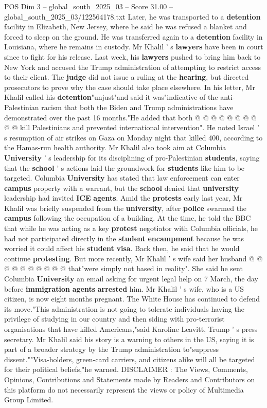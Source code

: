 \begin{textsample}{POS Dim 3 – global\_south\_2025\_03 – Score 31.00 – global\_south\_2025\_03/122564178.txt}
Later, he was transported to a \textbf{detention} facility in Elizabeth, New Jersey, where he said he was refused a blanket and forced to sleep on the ground.
He was transferred again to a \textbf{detention} facility in Louisiana, where he remains in custody.
Mr Khalil ' s \textbf{lawyers} have been in court since to fight for his release.
Last week, his \textbf{lawyers} pushed to bring him back to New York and accused the Trump administration of attempting to restrict access to their client.
The \textbf{judge} did not issue a ruling at the \textbf{hearing}, but directed prosecutors to prove why the case should take place elsewhere.
In his letter, Mr Khalil called his \textbf{detention}"unjust"and said it was"indicative of the anti-Palestinian racism that both the Biden and Trump administrations have demonstrated over the past 16 months."He added that both @ @ @ @ @ @ @ @ @ @ kill Palestinians and prevented international intervention".
He noted Israel ' s resumption of air strikes on Gaza on Monday night that killed 400, according to the Hamas-run health authority.
Mr Khalil also took aim at Columbia \textbf{University} ' s leadership for its disciplining of pro-Palestinian \textbf{students}, saying that the \textbf{school} ' s actions laid the groundwork for \textbf{students} like him to be targeted.
Columbia \textbf{University} has stated that law enforcement can enter \textbf{campus} property with a warrant, but the \textbf{school} denied that \textbf{university} leadership had invited \textbf{ICE} \textbf{agents}.
Amid the \textbf{protests} early last year, Mr Khalil was briefly suspended from the \textbf{university}, after \textbf{police} swarmed the \textbf{campus} following the occupation of a building.
At the time, he told the BBC that while he was acting as a key \textbf{protest} negotiator with Columbia officials, he had not participated directly in the \textbf{student} \textbf{encampment} because he was worried it could affect his \textbf{student} \textbf{visa}.
Back then, he said that he would continue \textbf{protesting}.
But more recently, Mr Khalil ' s wife said her husband @ @ @ @ @ @ @ @ @ @ that"were simply not based in reality".
She said he sent Columbia \textbf{University} an email asking for urgent legal help on 7 March, the day before \textbf{immigration} \textbf{agents} \textbf{arrested} him.
Mr Khalil ' s wife, who is a US citizen, is now eight months pregnant.
The White House has continued to defend its move."This administration is not going to tolerate individuals having the privilege of studying in our country and then siding with pro-terrorist organisations that have killed Americans,"said Karoline Leavitt, Trump ' s press secretary.
Mr Khalil said his story is a warning to others in the US, saying it is part of a broader strategy by the Trump administration to"suppress dissent.""Visa-holders, green-card carriers, and citizens alike will all be targeted for their political beliefs,"he warned.
DISCLAIMER : The Views, Comments, Opinions, Contributions and Statements made by Readers and Contributors on this platform do not necessarily represent the views or policy of Multimedia Group Limited.


\end{textsample}
